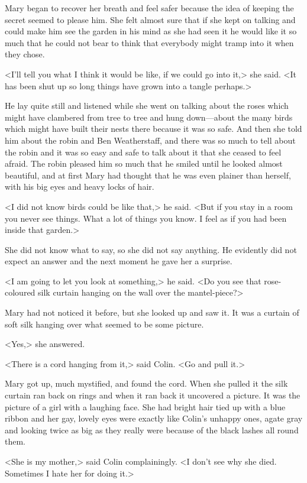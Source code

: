 Mary began to recover her breath and feel safer because the idea of keeping the secret seemed to please him. She felt almost sure that if she kept on talking and could make him see the garden in his mind as she had seen it he would like it so much that he could not bear to think that everybody might tramp into it when they chose.

<I'll tell you what I think it would be like, if we could go into it,> she said. <It has been shut up so long things have grown into a tangle perhaps.>

He lay quite still and listened while she went on talking about the roses which might have clambered from tree to tree and hung down—about the many birds which might have built their nests there because it was so safe. And then she told him about the robin and Ben Weatherstaff, and there was so much to tell about the robin and it was so easy and safe to talk about it that she ceased to feel afraid. The robin pleased him so much that he smiled until he looked almost beautiful, and at first Mary had thought that he was even plainer than herself, with his big eyes and heavy locks of hair.

<I did not know birds could be like that,> he said. <But if you stay in a room you never see things. What a lot of things you know. I feel as if you had been inside that garden.>

She did not know what to say, so she did not say anything. He evidently did not expect an answer and the next moment he gave her a surprise.

<I am going to let you look at something,> he said. <Do you see that rose-coloured silk curtain hanging on the wall over the mantel-piece?>

Mary had not noticed it before, but she looked up and saw it. It was a curtain of soft silk hanging over what seemed to be some picture.

<Yes,> she answered.

<There is a cord hanging from it,> said Colin. <Go and pull it.>

Mary got up, much mystified, and found the cord. When she pulled it the silk curtain ran back on rings and when it ran back it uncovered a picture. It was the picture of a girl with a laughing face. She had bright hair tied up with a blue ribbon and her gay, lovely eyes were exactly like Colin's unhappy ones, agate gray and looking twice as big as they really were because of the black lashes all round them.

<She is my mother,> said Colin complainingly. <I don't see why she died. Sometimes I hate her for doing it.>

